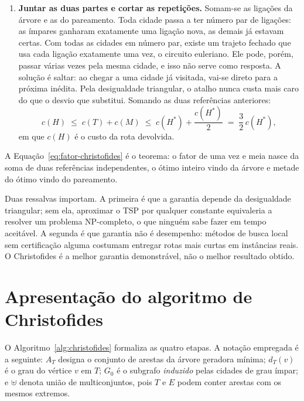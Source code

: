 \begin{enumerate}
	\item \textbf{Juntar as duas partes e cortar as repetições.} Somam-se as
	ligações da árvore e as do pareamento. Toda cidade passa a ter número par de
	ligações: as ímpares ganharam exatamente uma ligação nova, as demais já
	estavam certas. Com todas as cidades em número par, existe um trajeto fechado
	que usa cada ligação exatamente uma vez, o circuito euleriano. Ele pode,
	porém, passar várias vezes pela mesma cidade, e isso não serve como resposta.
	A solução é saltar: ao chegar a uma cidade já visitada, vai-se direto para a
	próxima inédita. Pela desigualdade triangular, o atalho nunca custa mais caro
	do que o desvio que substitui. Somando as duas referências anteriores:
	\begin{equation}
		c(H) \;\leq\; c(T) + c(M)
		\;\leq\; c(H^{*}) + \frac{c(H^{*})}{2}
		\;=\; \frac{3}{2}\,c(H^{*}),
		\label{eq:fator-christofides}
	\end{equation}
	em que $c(H)$ é o custo da rota devolvida.
\end{enumerate}

A Equação~\eqref{eq:fator-christofides} é o teorema: o fator de uma vez e meia
nasce da soma de duas referências independentes, o ótimo inteiro vindo da
árvore e metade do ótimo vindo do pareamento.

Duas ressalvas importam. A primeira é que a garantia depende da desigualdade
triangular; sem ela, aproximar o TSP por qualquer constante equivaleria a
resolver um problema NP-completo, o que ninguém sabe fazer em tempo aceitável.
A segunda é que garantia não é desempenho: métodos de busca local sem
certificação alguma costumam entregar rotas mais curtas em instâncias reais. O
Christofides é a melhor garantia demonstrável, não o melhor resultado obtido.

\section{Apresentação do algoritmo de Christofides}
\label{sec:christofides}

O Algoritmo~\ref{alg:christofides} formaliza as quatro etapas. A notação
empregada é a seguinte: $A_T$ designa o conjunto de arestas da árvore geradora
mínima; $d_T(v)$ é o grau do vértice $v$ em $T$; $G_0$ é o subgrafo
\emph{induzido} pelas cidades de grau ímpar; e $\uplus$ denota união de
multiconjuntos, pois $T$ e $E$ podem conter arestas com os mesmos extremos.

